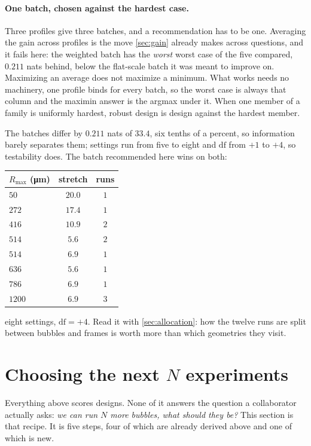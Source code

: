 \documentclass[10pt]{article}
\begin{document}
\paragraph{One batch, chosen against the hardest case.}
Three profiles give three batches, and a recommendation has to be one. Averaging the gain across
profiles is the move \cref{sec:gain} already makes across questions, and it fails here: the
weighted batch has the \emph{worst} worst case of the five compared, $0.211$ nats behind, below
the flat-scale batch it was meant to improve on. Maximizing an average does not maximize a
minimum. What works needs no machinery, one profile binds for every batch, so the worst case
is always that column and the maximin answer is the argmax under it. When one member of a family
is uniformly hardest, robust design is design against the hardest member.

The batches differ by $0.211$ nats of $33.4$, six tenths of a percent, so information barely
separates them; settings run from five to eight and $\mathrm{df}$ from $+1$ to $+4$, so
testability does. The batch recommended here wins on both:

\begin{center}
\begin{tabular}{lcc}
\toprule
$R_{\max}$ (\si{\micro\metre}) & stretch & runs \\
\midrule
$50$ & $20.0$ & $1$ \\
$272$ & $17.4$ & $1$ \\
$416$ & $10.9$ & $2$ \\
$514$ & $5.6$ & $2$ \\
$514$ & $6.9$ & $1$ \\
$636$ & $5.6$ & $1$ \\
$786$ & $6.9$ & $1$ \\
$1200$ & $6.9$ & $3$ \\
\bottomrule
\end{tabular}
\end{center}

\noindent eight settings, $\mathrm{df} = +4$. Read it with \cref{sec:allocation}: how the twelve
runs are split between bubbles and frames is worth more than which geometries they visit.

\section{Choosing the next \texorpdfstring{$N$}{N} experiments}
\label{sec:batch}

Everything above scores designs. None of it answers the question a collaborator actually
asks: \emph{we can run $N$ more bubbles, what should they be?} This section is that recipe. It
is five steps, four of which are already derived above and one of which is new.
\end{document}
